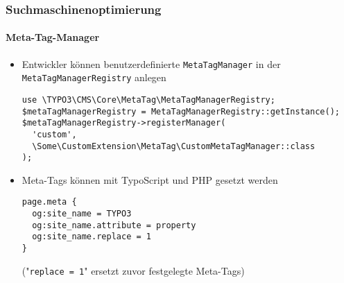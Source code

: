 \begin{frame}[fragile]
	\frametitle{Suchmaschinenoptimierung}
	\framesubtitle{Meta-Tag-Manager}

	\lstset{basicstyle=\tiny\ttfamily}

	\begin{itemize}
		\item Entwickler können benutzerdefinierte \texttt{MetaTagManager} in der
			\texttt{MetaTagManagerRegistry} anlegen

\begin{lstlisting}
use \TYPO3\CMS\Core\MetaTag\MetaTagManagerRegistry;
$metaTagManagerRegistry = MetaTagManagerRegistry::getInstance();
$metaTagManagerRegistry->registerManager(
  'custom',
  \Some\CustomExtension\MetaTag\CustomMetaTagManager::class
);
\end{lstlisting}

		\item Meta-Tags können mit TypoScript und PHP gesetzt werden

\begin{lstlisting}
page.meta {
  og:site_name = TYPO3
  og:site_name.attribute = property
  og:site_name.replace = 1
}
\end{lstlisting}

			\smaller
				("\texttt{replace = 1}" ersetzt zuvor festgelegte Meta-Tags)
			\normalsize

	\end{itemize}

\end{frame}

